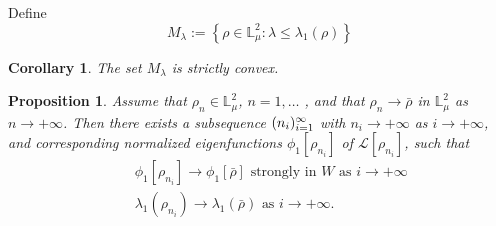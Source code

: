 \documentclass[12pt,thmsa]{article}
\newtheorem{proposition}[theorem]{Proposition}
\newtheorem{corollary}[theorem]{Corollary}
\begin{document}
Define
\begin{equation*}
M_{\lambda }:=\left\{ \rho \in \mathbb{L}_{\mu }^{2}:\lambda \leq \lambda
_{1}(\rho )\right\}
\end{equation*}

\begin{corollary}
The set $M_{\lambda}$ is strictly convex.
\end{corollary}

\begin{proposition}
\label{prop3} Assume that $\rho _{n}\in \mathbb{L}_{\mu }^{2}$, $n=1,\ldots $%
, and that $\rho _{n}\rightarrow \bar{\rho}$ in $\mathbb{L}_{\mu }^{2}$ as $%
n\rightarrow +\infty $. Then there exists a subsequence $(n_{i})_{i=1}^{%
\infty }$ with $n_{i}\rightarrow +\infty $ as $i\rightarrow +\infty $, and
corresponding normalized eigenfunctions $\phi _{1}[\rho _{n_{i}}]$ of $%
\mathcal{L}[\rho _{n_{i}}]$, such that
\begin{eqnarray*}
&&\phi _{1}[\rho _{n_{i}}]\rightarrow \phi _{1}[\bar{\rho}]\text{ strongly
in }W\text{ as }i\rightarrow +\infty \\
&&\lambda _{1}(\rho _{n_{i}})\rightarrow \lambda _{1}(\bar{\rho})\text{ as }%
i\rightarrow +\infty .
\end{eqnarray*}
\end{proposition}
\end{document}
